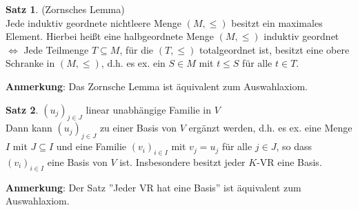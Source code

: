 \documentclass[10pt,a4paper,numbers=endperiod]{scrartcl}
\theoremstyle{definition}
\newtheorem{satz}{Satz}[section]
\begin{document}
\begin{satz}
	(Zornsches Lemma)\\
	Jede induktiv geordnete nichtleere Menge $(M,\leq)$ besitzt ein maximales Element. Hierbei heißt eine halbgeordnete Menge $(M, \leq)$ induktiv geordnet $\Leftrightarrow$ Jede Teilmenge $T\subseteq M$, für die $(T,\leq)$ totalgeordnet ist, besitzt eine obere Schranke in $(M,\leq)$, d.h. es ex. ein $S \in M$ mit $t \leq S$ für alle $t\in T$.
\end{satz}

\textbf{Anmerkung}: Das Zornsche Lemma ist äquivalent zum Auswahlaxiom.

\begin{satz}
	$(u_j)_{j \in J}$ linear unabhängige Familie in $V$\\
	Dann kann $(u_j)_{j \in J}$ zu einer Basis von $V$ ergänzt werden, d.h. es ex. eine Menge $I$ mit $J \subseteq I$ und eine Familie $(v_i)_{i \in I}$ mit $v_j=u_j$ für alle $j \in J$, so dass $(v_i)_{i \in I}$ eine Basis von $V$ ist. Insbesondere besitzt jeder $K$-VR eine Basis. 
\end{satz}

\textbf{Anmerkung}: Der Satz ''Jeder VR hat eine Basis'' ist äquivalent zum Auswahlaxiom.\\

\vspace{\baselineskip}
\vspace{\baselineskip}
\vspace{\baselineskip}
\vspace{\baselineskip}
\vspace{\baselineskip}
\end{document}
